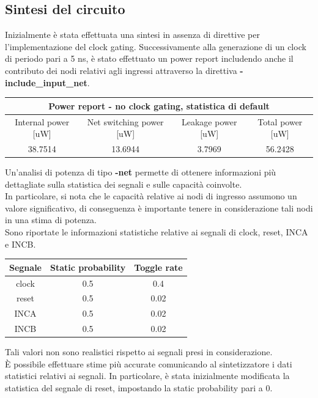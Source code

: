 \documentclass[11pt,  english, makeidx, a4paper, titlepage, oneside]{book}
\begin{document}
\subsection{Sintesi del circuito}
Inizialmente è stata effettuata una sintesi in assenza di direttive per l'implementazione del clock gating.
Successivamente alla generazione di un clock di periodo pari a 5 ns, è stato effettuato un power report includendo anche il contributo dei nodi relativi agli ingressi attraverso la direttiva \textbf{-include\_input\_net}.
\\
\begin{center}
	\begin{tabular}{|c|c|c|c|}
	\hline
	\multicolumn{4}{c}{Power report - no clock gating, statistica di default} \\
	\hline
	Internal power [uW] & Net switching power [uW] & Leakage power [uW] & Total power [uW] \\
	\hline
	 38.7514 & 13.6944  &  3.7969  &  56.2428 \\
	\hline
	\end{tabular}	
\end{center}
\vspace{0.3cm}
Un'analisi di potenza di tipo \textbf{-net} permette di ottenere informazioni più dettagliate sulla statistica dei segnali e sulle capacità coinvolte. 
\\
In particolare, si nota che le capacità relative ai nodi di ingresso assumono un valore significativo, di conseguenza è importante tenere in considerazione tali nodi in una stima di potenza.
\\
Sono riportate le informazioni statistiche relative ai segnali di clock, reset, INCA e INCB.
\\
\begin{center}
	\begin{tabular}{|c|c|c|}
	\hline
Segnale & Static probability & Toggle rate \\
	\hline
	 clock & 0.5  &  0.4 \\
	\hline
	 reset & 0.5  &  0.02 \\
	\hline
	 INCA & 0.5  &  0.02 \\
	\hline
	 INCB & 0.5  &  0.02 \\
	\hline
	\end{tabular}	
\end{center}
\vspace{0.3cm}
Tali valori non sono realistici rispetto ai segnali presi in considerazione.
\\
È possibile effettuare stime più accurate comunicando al sintetizzatore i dati statistici relativi ai segnali. In particolare, è stata inizialmente modificata la statistica del segnale di reset, impostando la static probability pari a 0.
\end{document}

